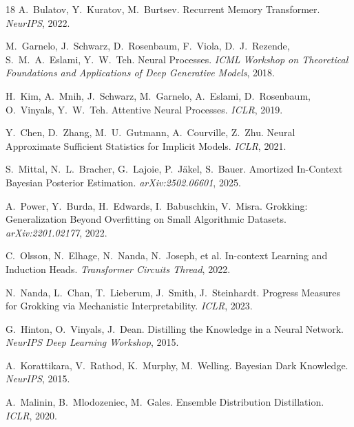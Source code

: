 \documentclass{article}
\begin{document}
\begin{thebibliography}{18}
A.~Bulatov, Y.~Kuratov, M.~Burtsev.
\newblock Recurrent Memory Transformer.
\newblock \emph{NeurIPS}, 2022.

M.~Garnelo, J.~Schwarz, D.~Rosenbaum, F.~Viola, D.~J.~Rezende,
S.~M.~A.~Eslami, Y.~W.~Teh.
\newblock Neural Processes.
\newblock \emph{ICML Workshop on Theoretical Foundations and Applications
of Deep Generative Models}, 2018.

H.~Kim, A.~Mnih, J.~Schwarz, M.~Garnelo, A.~Eslami, D.~Rosenbaum,
O.~Vinyals, Y.~W.~Teh.
\newblock Attentive Neural Processes.
\newblock \emph{ICLR}, 2019.

Y.~Chen, D.~Zhang, M.~U.~Gutmann, A.~Courville, Z.~Zhu.
\newblock Neural Approximate Sufficient Statistics for Implicit Models.
\newblock \emph{ICLR}, 2021.

S.~Mittal, N.~L.~Bracher, G.~Lajoie, P.~J\"akel, S.~Bauer.
\newblock Amortized In-Context Bayesian Posterior Estimation.
\newblock \emph{arXiv:2502.06601}, 2025.

A.~Power, Y.~Burda, H.~Edwards, I.~Babuschkin, V.~Misra.
\newblock Grokking: Generalization Beyond Overfitting on Small Algorithmic
Datasets.
\newblock \emph{arXiv:2201.02177}, 2022.

C.~Olsson, N.~Elhage, N.~Nanda, N.~Joseph, et al.
\newblock In-context Learning and Induction Heads.
\newblock \emph{Transformer Circuits Thread}, 2022.

N.~Nanda, L.~Chan, T.~Lieberum, J.~Smith, J.~Steinhardt.
\newblock Progress Measures for Grokking via Mechanistic Interpretability.
\newblock \emph{ICLR}, 2023.

G.~Hinton, O.~Vinyals, J.~Dean.
\newblock Distilling the Knowledge in a Neural Network.
\newblock \emph{NeurIPS Deep Learning Workshop}, 2015.

A.~Korattikara, V.~Rathod, K.~Murphy, M.~Welling.
\newblock Bayesian Dark Knowledge.
\newblock \emph{NeurIPS}, 2015.

A.~Malinin, B.~Mlodozeniec, M.~Gales.
\newblock Ensemble Distribution Distillation.
\newblock \emph{ICLR}, 2020.


\end{thebibliography}
\end{document}
